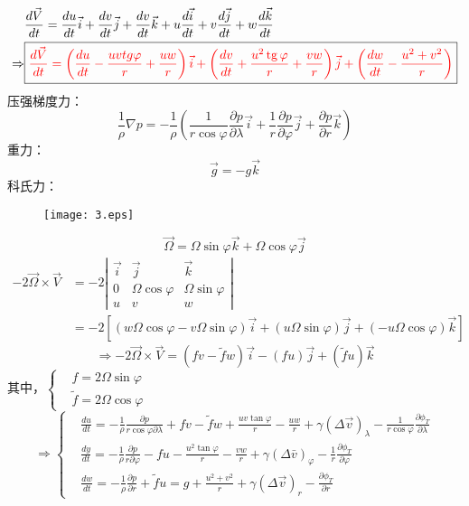 \documentclass[a4paper,12pt]{article}
\begin{document}
    \newpage
    \[
        \begin{aligned}
            &\frac{d \vec{V}}{d t}=\frac{d u}{d t} \vec{i}+\frac{d v}{d t} \vec{j}+\frac{d v}{d t} \vec{k}+u \frac{d \vec{i}}{d t}+v \frac{d \vec{j}}{d t}+w \frac{d \vec{k}}{d t}\\
            \Rightarrow&\boxed{\color{red}\frac{d \vec{V}}{d t}=\left(\frac{d u}{d t}-\frac{u v t g \varphi}{r}+\frac{u w}{r}\right) \vec{i}+\left(\frac{d v}{d t}+\frac{u^{2} \operatorname{tg} \varphi}{r}+\frac{v w}{r}\right) \vec{j}+\left(\frac{d w}{d t}-\frac{u^{2}+v^{2}}{r}\right)}
        \end{aligned}
    \]
    压强梯度力：
    \[
        \frac{1}{\rho}\nabla p=-\frac{1}{\rho}\left(\frac{1}{r \cos \varphi} \frac{\partial p}{\partial \lambda} \vec{i}+\frac{1}{r} \frac{\partial p}{\partial \varphi} \vec{j}+\frac{\partial p}{\partial r} \vec{k}\right)
    \]
    重力：
    \[
        \vec{g}=-g\vec{k}
    \]
    科氏力：
    \begin{figure}[H]
        \centering \texttt{[image: 3.eps]}
        \caption*{}
    \end{figure}
    \vspace{-2cm}
    \[
        \vec{\Omega}=\Omega \sin \varphi \vec{k}+\Omega \cos \varphi \vec{j}
    \]
    \[
        \begin{aligned}
            -2 \vec{\Omega} \times \vec{V}&=-2\left|\begin{array}{ccc}\vec{i} & \vec{j} & \vec{k} \\ 0 & \Omega \cos \varphi & \Omega \sin \varphi \\ u & v & w\end{array}\right|\\
            &=-2[(w \Omega \cos \varphi-v \Omega \sin \varphi) \vec{i}+(u \Omega \sin \varphi) \vec{j}+(-u \Omega \cos \varphi) \vec{k}]
        \end{aligned}
    \]
    \[
        \Rightarrow-2 \vec{\Omega} \times \vec{V}=(f v-\tilde{f} w) \vec{i}-(f u) \vec{j}+(\tilde{f} u) \vec{k}
    \]
    其中，$\displaystyle\left\{\begin{aligned}&f=2\Omega \sin\varphi\\ &\tilde{f}=2\Omega \cos\varphi\end{aligned}\right.$
    \[
        \Rightarrow
        \boxed{
        \left\{
        \begin{aligned}
            &\frac{d u}{d t}=-\frac{1}{\rho} \frac{\partial p}{r \cos \varphi \partial \lambda}+f v-\tilde{f} w+\frac{u v \tan \varphi}{r}-\frac{u w}{r}+\gamma(\Delta \vec{v})_{\lambda}-\frac{1}{r \cos \varphi} \frac{\partial \phi_{T}}{\partial \lambda}\\
            &\frac{d y}{d t}=- \frac{1}{\rho} \frac{\partial p}{r \partial \varphi}-f u-\frac{u^{2} \tan \varphi}{r}-\frac{v w}{r}+\gamma(\Delta \bar{v})_{\varphi}-\frac{1}{r} \frac{\partial \phi_{T}}{\partial \varphi}\\
            &\frac{d w}{d t}=-\frac{1}{\rho} \frac{\partial p}{\partial r}+\tilde{f} u=g+\frac{u^{2}+v^{2}}{r}+\gamma(\Delta \vec{v})_{r}-\frac{\partial \phi_{T}}{\partial r}
        \end{aligned}
        \right.
        }
    \]
\end{document}

